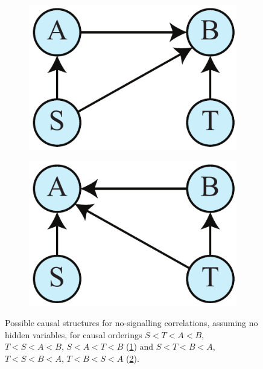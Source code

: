 \documentclass[letterpaper,onecolumn,nofootinbib]{revtex4}
\begin{document}
\begin{figure}[h]
        \begin{subfigure}[b]{0.18\textwidth}
                	\centering
                	\includegraphics[width=\textwidth]{bell-gen-AB}
		\subcaption{}
		\label{fig:bell-gen-AB}
	\end{subfigure}
        \hspace{8em}
        \begin{subfigure}[b]{0.18\textwidth}
                	\centering
                	\includegraphics[width=\textwidth]{bell-gen-BA}
             	\subcaption{}
                	\label{fig:bell-gen-BA}
        \end{subfigure}
        \caption{Possible causal structures for no-signalling correlations, assuming no hidden variables, for causal orderings $S<T<A<B$, $T<S<A<B$, $S<A<T<B$ (\ref{fig:bell-gen-AB}) and $S<T<B<A$, $T<S<B<A$, $T<B<S<A$ (\ref{fig:bell-gen-BA}).}
        \label{fig:bell-gen-ind}
\end{figure}
\end{document}
